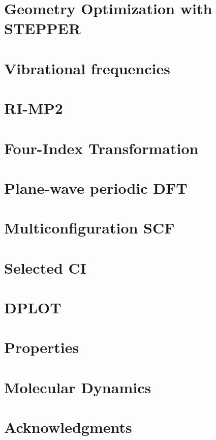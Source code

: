 \section{Geometry Optimization with STEPPER}

\section{Vibrational frequencies}


\section{RI-MP2}


\section{Four-Index Transformation} 


\section{Plane-wave periodic DFT}


\section{Multiconfiguration SCF}


\section{Selected CI}


\section{DPLOT}


\section{Properties}


\section{Molecular Dynamics}


\section{Acknowledgments}



